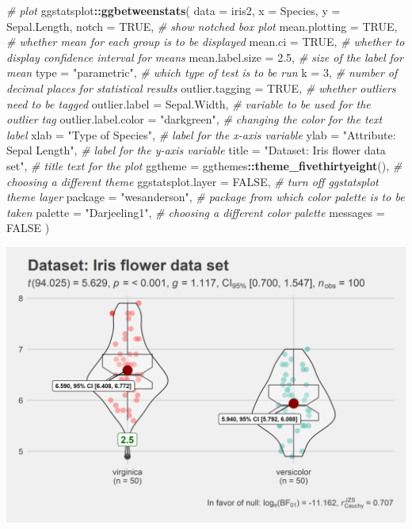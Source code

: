 \documentclass[]{article}
\newenvironment{Shaded}{\begin{snugshade}}{\end{snugshade}}
\newcommand{\CommentTok}[1]{\textcolor[rgb]{0.56,0.35,0.01}{\textit{#1}}}
\newcommand{\DataTypeTok}[1]{\textcolor[rgb]{0.13,0.29,0.53}{#1}}
\newcommand{\DecValTok}[1]{\textcolor[rgb]{0.00,0.00,0.81}{#1}}
\newcommand{\FloatTok}[1]{\textcolor[rgb]{0.00,0.00,0.81}{#1}}
\newcommand{\KeywordTok}[1]{\textcolor[rgb]{0.13,0.29,0.53}{\textbf{#1}}}
\newcommand{\NormalTok}[1]{#1}
\newcommand{\OperatorTok}[1]{\textcolor[rgb]{0.81,0.36,0.00}{\textbf{#1}}}
\newcommand{\OtherTok}[1]{\textcolor[rgb]{0.56,0.35,0.01}{#1}}
\newcommand{\StringTok}[1]{\textcolor[rgb]{0.31,0.60,0.02}{#1}}
\begin{document}
\begin{Shaded}
\begin{Highlighting}[]
\CommentTok{# plot}
\NormalTok{ggstatsplot}\OperatorTok{::}\KeywordTok{ggbetweenstats}\NormalTok{(}
  \DataTypeTok{data =}\NormalTok{ iris2,}
  \DataTypeTok{x =}\NormalTok{ Species,}
  \DataTypeTok{y =}\NormalTok{ Sepal.Length,}
  \DataTypeTok{notch =} \OtherTok{TRUE}\NormalTok{, }\CommentTok{# show notched box plot}
  \DataTypeTok{mean.plotting =} \OtherTok{TRUE}\NormalTok{, }\CommentTok{# whether mean for each group is to be displayed}
  \DataTypeTok{mean.ci =} \OtherTok{TRUE}\NormalTok{, }\CommentTok{# whether to display confidence interval for means}
  \DataTypeTok{mean.label.size =} \FloatTok{2.5}\NormalTok{, }\CommentTok{# size of the label for mean}
  \DataTypeTok{type =} \StringTok{"parametric"}\NormalTok{, }\CommentTok{# which type of test is to be run}
  \DataTypeTok{k =} \DecValTok{3}\NormalTok{, }\CommentTok{# number of decimal places for statistical results}
  \DataTypeTok{outlier.tagging =} \OtherTok{TRUE}\NormalTok{, }\CommentTok{# whether outliers need to be tagged}
  \DataTypeTok{outlier.label =}\NormalTok{ Sepal.Width, }\CommentTok{# variable to be used for the outlier tag}
  \DataTypeTok{outlier.label.color =} \StringTok{"darkgreen"}\NormalTok{, }\CommentTok{# changing the color for the text label}
  \DataTypeTok{xlab =} \StringTok{"Type of Species"}\NormalTok{, }\CommentTok{# label for the x-axis variable}
  \DataTypeTok{ylab =} \StringTok{"Attribute: Sepal Length"}\NormalTok{, }\CommentTok{# label for the y-axis variable}
  \DataTypeTok{title =} \StringTok{"Dataset: Iris flower data set"}\NormalTok{, }\CommentTok{# title text for the plot}
  \DataTypeTok{ggtheme =}\NormalTok{ ggthemes}\OperatorTok{::}\KeywordTok{theme_fivethirtyeight}\NormalTok{(), }\CommentTok{# choosing a different theme}
  \DataTypeTok{ggstatsplot.layer =} \OtherTok{FALSE}\NormalTok{, }\CommentTok{# turn off ggstatsplot theme layer}
  \DataTypeTok{package =} \StringTok{"wesanderson"}\NormalTok{, }\CommentTok{# package from which color palette is to be taken}
  \DataTypeTok{palette =} \StringTok{"Darjeeling1"}\NormalTok{, }\CommentTok{# choosing a different color palette}
  \DataTypeTok{messages =} \OtherTok{FALSE}
\NormalTok{)}
\end{Highlighting}
\end{Shaded}

\includegraphics[width=1\linewidth]{./figures/paper-ggbetweenstats2-1}
\end{document}
